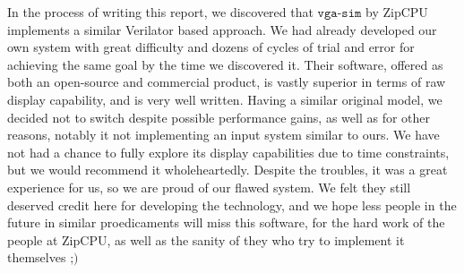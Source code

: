 In the process of writing this report, we discovered that \(\texttt{vga-sim}\)
by ZipCPU \cite{vgasimzip} implements a similar Verilator based approach. We had
already developed our own system with great difficulty and dozens of cycles of 
trial and error for achieving the same goal by the time we discovered it. Their
software, offered as both an open-source and commercial product, is vastly superior 
in terms of raw display capability, and is very well written. Having a similar 
original model, we decided not to switch despite possible performance gains, as well
as for other reasons, notably it not implementing an input system similar to ours.
We have not had a chance to fully explore its display capabilities due to time
constraints, but we would recommend it wholeheartedly. Despite the troubles,
it was a great experience for us, so we are proud of our flawed system.
We felt they still deserved credit here for developing the technology, and we hope
less people in the future in similar proedicaments will miss this software, 
for the hard work of the people at ZipCPU, as well as the sanity of they
who try to implement it themselves \(\textsf{;)}\)  